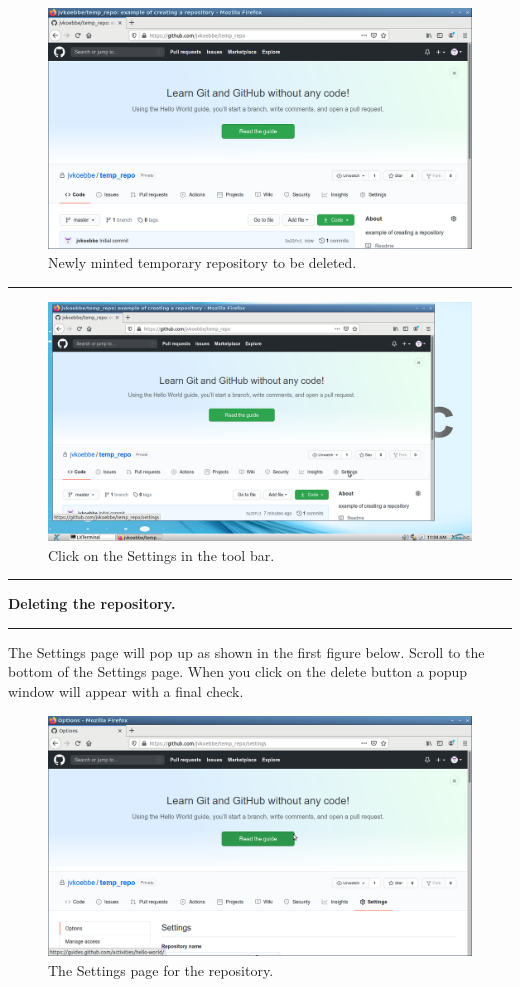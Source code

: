 \documentclass[10pt,fleqn]{article}
\begin{document}
\begin{figure}[h]
\centering
\includegraphics[width=5.0in]{../images/github_10.png}
\caption{Newly minted temporary repository to be deleted.}
\end{figure}
\vskip0.1in\hrule\vskip0.1in
\vfill
\begin{figure}[h]
\centering
\includegraphics[width=5.0in]{../images/github_11.png}
\caption{Click on the Settings in the tool bar.}
\end{figure}
\eject
\vskip0.1in\hrule\vskip0.1in\noindent
{\bf Deleting the repository.} 
\vskip0.1in\hrule\vskip0.1in\noindent
The Settings page will pop up as shown in the first figure below. Scroll to the
bottom of the Settings page. When you click on the delete button a popup window
will appear with a final check.
\vfill
\begin{figure}[h]
\centering
\includegraphics[width=5.0in]{../images/github_12.png}
\caption{The Settings page for the repository.}
\end{figure}
\end{document}
